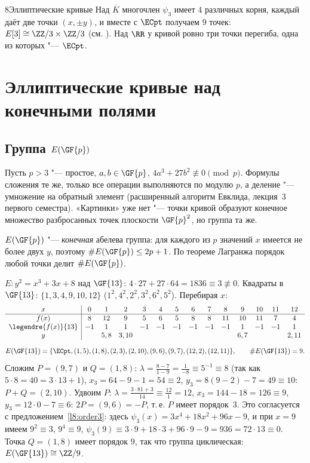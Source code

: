 \begin{lecture}{8}{Эллиптические кривые}
Над $\overline K$ многочлен $\psi_3$ имеет $4$ различных корня, каждый даёт две точки
$(x, \pm y)$, и вместе с $\ECpt$ получаем $9$ точек: $E[3] \cong \ZZ/3 \times \ZZ/3$ (см.
\cite[разд.~3.1]{washington}). Над $\RR$ у кривой ровно три точки перегиба, одна из которых "---
$\ECpt$.

\section{Эллиптические кривые над конечными полями}

\subsection{Группа $E(\GF{p})$}

Пусть $p > 3$ "--- простое, $a, b \in \GF{p}$, $4a^3 + 27b^2 \not\equiv 0 \pmod p$. Формулы
сложения те же, только все операции выполняются по модулю $p$, а деление "--- умножение на
обратный элемент (расширенный алгоритм Евклида, лекция~3 первого семестра). «Картинки» уже нет "---
точки кривой образуют конечное множество разбросанных точек плоскости $\GF{p}^2$, но группа
та же.

$E(\GF{p})$ "--- \emph{конечная} абелева группа: для каждого из $p$ значений $x$ имеется не
более двух $y$, поэтому $\#E(\GF{p}) \le 2p + 1$. По теореме Лагранжа порядок любой точки делит
$\#E(\GF{p})$.

\begin{example}\label{l8:ex-f13}
$E\colon y^2 = x^3 + 3x + 8$ над $\GF{13}$: $4 \cdot 27 + 27 \cdot 64 = 1836 \equiv 3 \not\equiv 0$.
Квадраты в $\GF{13}$: $\{1, 3, 4, 9, 10, 12\}$ ($1^2, 4^2, 2^2, 3^2, 6^2, 5^2$). Перебирая $x$:
\[
\begin{array}{c|ccccccccccccc}
x & 0 & 1 & 2 & 3 & 4 & 5 & 6 & 7 & 8 & 9 & 10 & 11 & 12\\ \hline
f(x) & 8 & 12 & 9 & 5 & 6 & 5 & 8 & 8 & 11 & 10 & 11 & 7 & 4\\
\legendre{f(x)}{13} & -1 & 1 & 1 & -1 & -1 & -1 & -1 & -1 & -1 & 1 & -1 & -1 & 1\\
y & & 5, 8 & 3, 10 & & & & & & & 6, 7 & & & 2, 11
\end{array}
\]
\[
  E(\GF{13}) = \{\ECpt, (1, 5), (1, 8), (2, 3), (2, 10), (9, 6), (9, 7), (12, 2), (12, 11)\},
  \qquad \#E(\GF{13}) = 9.
\]
Сложим $P = (9, 7)$ и $Q = (1, 8)$: $\lambda = \frac{8 - 7}{1 - 9} = \frac{1}{-8} \equiv 5^{-1}
\equiv 8$ (так как $5 \cdot 8 = 40 = 3 \cdot 13 + 1$), $x_3 = 64 - 9 - 1 = 54 \equiv 2$,
$y_3 = 8(9 - 2) - 7 = 49 \equiv 10$: $P + Q = (2, 10)$. Удвоим $P$:
$\lambda = \frac{3 \cdot 81 + 3}{14} \equiv \frac{12}{1} = 12$, $x_3 = 144 - 18 = 126 \equiv 9$,
$y_3 = 12 \cdot 0 - 7 \equiv 6$: $2P = (9, 6) = -P$, т.\,е. $P$ имеет порядок~$3$. Это
согласуется с предложением~\ref{l8:order3}: здесь $\psi_3(x) = 3x^4 + 18x^2 + 96x - 9$, и при
$x = 9$ имеем $9^2 \equiv 3$, $9^4 \equiv 9$,
$\psi_3(9) \equiv 3 \cdot 9 + 18 \cdot 3 + 96 \cdot 9 - 9 = 936 = 72 \cdot 13 \equiv 0$. Точка $Q = (1, 8)$ имеет
порядок $9$, так что группа циклическая: $E(\GF{13}) \cong \ZZ/9$.
\end{example}


\end{lecture}
